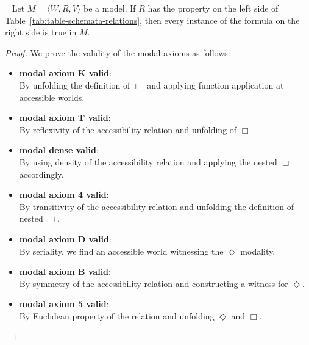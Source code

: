 \begin{theorem}
  \label{thm:truth-guarantee}
  \
  \leanok
  Let $M = \langle W, R, V \rangle$ be a model. If $R$ has the property 
  on the left side of Table~\ref{tab:table-schemata-relations}, then every instance of the formula on the 
  right side is true in $M$.
\end{theorem}
\begin{proof}\label{proof:truth-guarantee}
  We prove the validity of the modal axioms as follows:
  \begin{itemize}
    \item \textbf{modal axiom K valid}:  \\
    By unfolding the definition of \(\Box\) and applying function application at accessible worlds.

    \item \textbf{modal axiom T valid}: \\
    By reflexivity of the accessibility relation and unfolding of \(\Box\).

    \item \textbf{modal dense valid}: \\
    By using density of the accessibility relation and applying the nested \(\Box\) accordingly.

    \item \textbf{modal axiom 4 valid}: \\
    By transitivity of the accessibility relation and unfolding the definition of nested \(\Box.\)

    \item \textbf{modal axiom D valid}:  \\
    By seriality, we find an accessible world witnessing the \(\Diamond\) modality.

    \item \textbf{modal axiom B valid}:  \\
    By symmetry of the accessibility relation and constructing a witness for \(\Diamond\).

    \item \textbf{modal axiom 5 valid}: \\
    By Euclidean property of the relation and unfolding \(\Diamond\) and \(\Box\).
  \end{itemize}
\end{proof}

